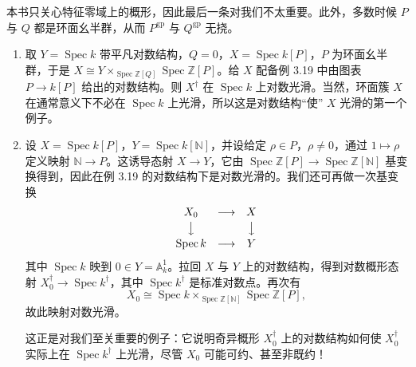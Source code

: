 本书只关心特征零域上的概形，因此最后一条对我们不太重要。此外，多数时候 $P$ 与 $Q$ 都是环面幺半群，从而 $P^{\mathrm{gp}}$ 与 $Q^{\mathrm{gp}}$ 无挠。


\begin{examples}
\begin{enumerate}[label=(\arabic*),leftmargin=2.2em,itemsep=3pt]
\item 取 $Y=\operatorname{Spec} k$ 带平凡对数结构，$Q=0$，$X=\operatorname{Spec} k[P]$，$P$ 为环面幺半群，于是 $X\cong Y\times_{\operatorname{Spec}\mathbb{Z}[Q]}\operatorname{Spec}\mathbb{Z}[P]$。给 $X$ 配备例 3.19 中由图表 $P\to k[P]$ 给出的对数结构。则 $X^{\dagger}$ 在 $\operatorname{Spec} k$ 上对数光滑。当然，环面簇 $X$ 在通常意义下不必在 $\operatorname{Spec} k$ 上光滑，所以这是对数结构“使” $X$ 光滑的第一个例子。
\item 设 $X=\operatorname{Spec} k[P]$，$Y=\operatorname{Spec} k[\mathbb{N}]$，并设给定 $\rho\in P$，$\rho\neq0$，通过 $1\mapsto\rho$ 定义映射 $\mathbb{N}\to P$。这诱导态射 $X\to Y$，它由 $\operatorname{Spec}\mathbb{Z}[P]\to\operatorname{Spec}\mathbb{Z}[\mathbb{N}]$ 基变换得到，因此在例 3.19 的对数结构下是对数光滑的。我们还可再做一次基变换
\[
\begin{array}{ccc}
  X_0 & \longrightarrow & X\\[2pt]
  \big\downarrow & & \big\downarrow\\[2pt]
  \operatorname{Spec} k & \longrightarrow & Y
\end{array}
\]
其中 $\operatorname{Spec} k$ 映到 $0\in Y=\mathbb{A}^1_k$。拉回 $X$ 与 $Y$ 上的对数结构，得到对数概形态射 $X_0^{\dagger}\to\operatorname{Spec} k^{\dagger}$，其中 $\operatorname{Spec} k^{\dagger}$ 是标准对数点。再次有
\[
  X_0\cong\operatorname{Spec} k\times_{\operatorname{Spec}\mathbb{Z}[\mathbb{N}]}\operatorname{Spec}\mathbb{Z}[P],
\]
故此映射对数光滑。

这正是对我们至关重要的例子：它说明奇异概形 $X_0^{\dagger}$ 上的对数结构如何使 $X_0^{\dagger}$ 实际上在 $\operatorname{Spec} k^{\dagger}$ 上光滑，尽管 $X_0$ 可能可约、甚至非既约！


\end{enumerate}
\end{examples}
